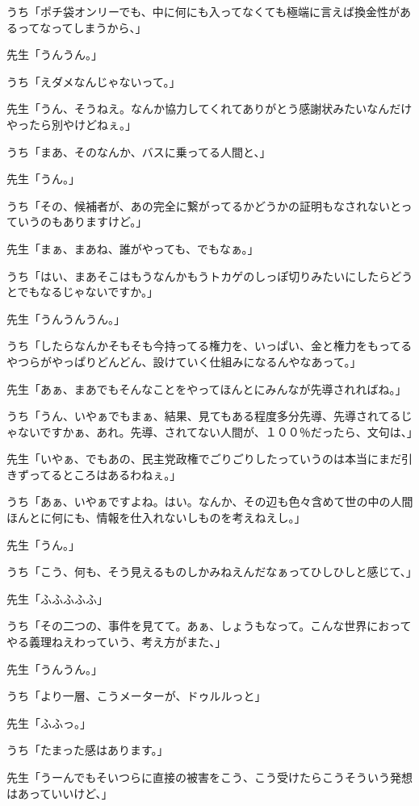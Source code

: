 \documentclass[b5j,twoside,twocolumn]{utarticle}
\begin{document}
\begin{description}
\item うち「ポチ袋オンリーでも、中に何にも入ってなくても極端に言えば換金性があるってなってしまうから、」
\item 先生「うんうん。」
\item うち「えダメなんじゃないって。」
\item 先生「うん、そうねえ。なんか協力してくれてありがとう感謝状みたいなんだけやったら別やけどねぇ。」
\item うち「まあ、そのなんか、バスに乗ってる人間と、」
\item 先生「うん。」
\item うち「その、候補者が、あの完全に繋がってるかどうかの証明もなされないとっていうのもありますけど。」
\item 先生「まぁ、まあね、誰がやっても、でもなぁ。」
\item うち「はい、まあそこはもうなんかもうトカゲのしっぽ切りみたいにしたらどうとでもなるじゃないですか。」
\item 先生「うんうんうん。」
\item うち「したらなんかそもそも今持ってる権力を、いっぱい、金と権力をもってるやつらがやっぱりどんどん、設けていく仕組みになるんやなあって。」
\item 先生「あぁ、まあでもそんなことをやってほんとにみんなが先導されればね。」
\item うち「うん、いやぁでもまぁ、結果、見てもある程度多分先導、先導されてるじゃないですかぁ、あれ。先導、されてない人間が、１００％だったら、文句は、」
\item 先生「いやぁ、でもあの、民主党政権でごりごりしたっていうのは本当にまだ引きずってるところはあるわねぇ。」
\item うち「あぁ、いやぁですよね。はい。なんか、その辺も色々含めて世の中の人間ほんとに何にも、情報を仕入れないしものを考えねえし。」
\item 先生「うん。」
\item うち「こう、何も、そう見えるものしかみねえんだなぁってひしひしと感じて、」
\item 先生「ふふふふふ」
\item うち「その二つの、事件を見てて。あぁ、しょうもなって。こんな世界におってやる義理ねえわっていう、考え方がまた、」
\item 先生「うんうん。」
\item うち「より一層、こうメーターが、ドゥルルっと」
\item 先生「ふふっ。」
\item うち「たまった感はあります。」
\item 先生「うーんでもそいつらに直接の被害をこう、こう受けたらこうそういう発想はあっていいけど、」

\end{description}
\end{document}
